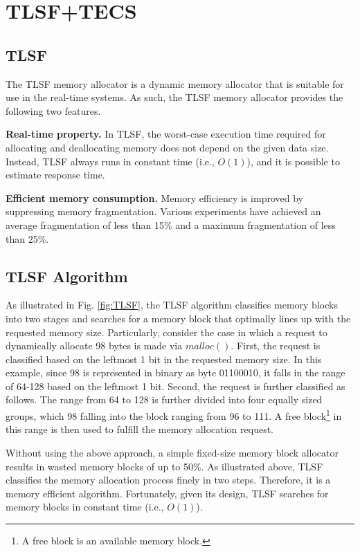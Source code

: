 \documentclass[a4j,12pt,oneside,openany,english]{jsbook}
\begin{document}
\section{TLSF+TECS}
\label{sec:TLSF+TECS}

\subsection{TLSF}

The TLSF memory allocator\cite{par:TLSF}\cite{url:TLSF} is a dynamic memory allocator that is suitable for use in the real-time systems.
As such, the TLSF memory allocator provides the following two features.

{\bf Real-time property.}
In TLSF, the worst-case execution time required for allocating and deallocating memory does not depend on the given data size.
Instead, TLSF always runs in constant time (i.e., $O(1)$), and it is possible to estimate response time.

{\bf Efficient memory consumption.}
Memory efficiency is improved by suppressing memory fragmentation.
Various experiments have achieved an average fragmentation of less than 15\% and a maximum fragmentation of less than 25\%.


\subsection{TLSF Algorithm}

As illustrated in Fig. \ref{fig:TLSF}, the TLSF algorithm classifies memory blocks into two stages and searches for a memory block that optimally lines up with the requested memory size.
Particularly, consider the case in which a request to dynamically allocate 98 bytes is made via $malloc()$.
First, the request is classified based on the leftmost 1 bit in the requested memory size.
In this example, since 98 is represented in binary as byte 01100010, it falls in the range of 64-128 based on the leftmost 1 bit.
Second, the request is further classified as follows.
The range from 64 to 128 is further divided into four equally sized groups, which 98 falling into the block ranging from 96 to 111.
A free block\footnote{A free block is an available memory block.} in this range is then used to fulfill the memory allocation request.

Without using the above approach, a simple fixed-size memory block allocator results in wasted memory blocks of up to 50\%.
As illustrated above, TLSF classifies the memory allocation process finely in two steps.
Therefore, it is a memory efficient algorithm.
Fortunately, given its design, TLSF searches for memory blocks in constant time (i.e., $O(1)$).
\end{document}
